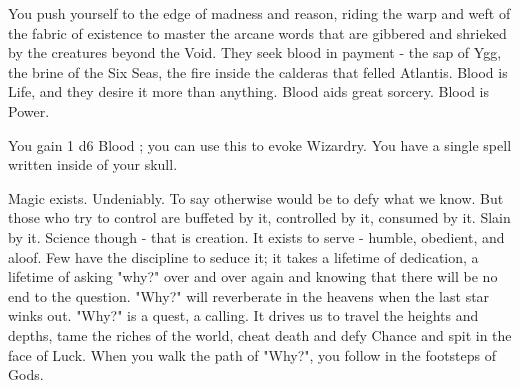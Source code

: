 {    


  You push yourself to the edge of madness and reason, riding the warp and weft of the fabric of existence to master the arcane words that are gibbered and shrieked by the creatures beyond the Void.  They seek blood in payment - the sap of  Ygg, the brine of the Six Seas, the fire inside the calderas that felled Atlantis.  Blood is Life, and they desire it more than anything.  Blood aids great sorcery. Blood is Power.  

  You gain 1 d6 Blood \POOL; you can use this \POOL to evoke Wizardry.  You have a single spell written inside of your skull. \footnotemark 


  Magic exists.  Undeniably.  To say otherwise would be to defy what we know.  But those who try to control  are buffeted by it, controlled by it, consumed by it.  Slain by it.  Science though - that is  creation.  It exists to serve - humble, obedient, and aloof.  Few have the discipline to seduce it; it takes a lifetime of dedication, a lifetime of asking "why?" over and over again and knowing that there will be no end to the question.  "Why?" will reverberate in the heavens when the last star winks out.  "Why?" is a quest, a calling.  It drives us to travel the heights and depths, tame the riches of the world, cheat death and defy Chance and spit in the face of Luck.  When you walk the path of "Why?", you follow in the footsteps of Gods.


}
